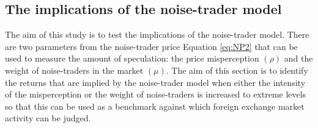 \documentclass[12pt, a4paper, oneside]{article} %
\begin{document}

\subsection{The implications of the noise-trader model}
The aim of this study is to test the implications of the noise-trader model.  There are two parameters from the noise-trader price Equation \ref{eq:NP2} that can be used to measure the amount of speculation:  the price misperception $(\rho)$ and the weight of noise-traders in the market $(\mu)$.  The aim of this section is to  identify the returns that are implied by the noise-trader model when either the intensity of the misperception or the weight of noise-traders is increased to extreme levels so that this can be used as a benchmark against which foreign exchange market activity can be judged. 
\end{document}
